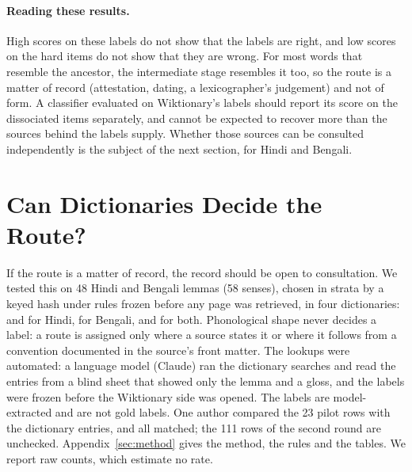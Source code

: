 \documentclass[11pt]{article}
\begin{document}
\paragraph{Reading these results.} High scores on these labels do not show that the labels are right, and low scores on the hard items do not show that they are wrong. For most words that resemble the ancestor, the intermediate stage resembles it too, so the route is a matter of record (attestation, dating, a lexicographer's judgement) and not of form. A classifier evaluated on Wiktionary's labels should report its score on the dissociated items separately, and cannot be expected to recover more than the sources behind the labels supply. Whether those sources can be consulted independently is the subject of the next section, for Hindi and Bengali.

\section{Can Dictionaries Decide the Route?}
\label{sec:why}

If the route is a matter of record, the record should be open to consultation. We tested this on 48 Hindi and Bengali lemmas (58 senses), chosen in strata by a keyed hash under rules frozen before any page was retrieved, in four dictionaries: \citet{platts1884} and \citet{dasa1975sabdasagara} for Hindi, \citet{dasa1937bangala} for Bengali, and \citet{turner1966cdial} for both. Phonological shape never decides a label: a route is assigned only where a source states it or where it follows from a convention documented in the source's front matter. The lookups were automated: a language model (Claude) ran the dictionary searches and read the entries from a blind sheet that showed only the lemma and a gloss, and the labels were frozen before the Wiktionary side was opened. The labels are model-extracted and are not gold labels. One author compared the 23 pilot rows with the dictionary entries, and all matched; the 111 rows of the second round are unchecked. Appendix~\ref{sec:method} gives the method, the rules and the tables. We report raw counts, which estimate no rate.
\end{document}
